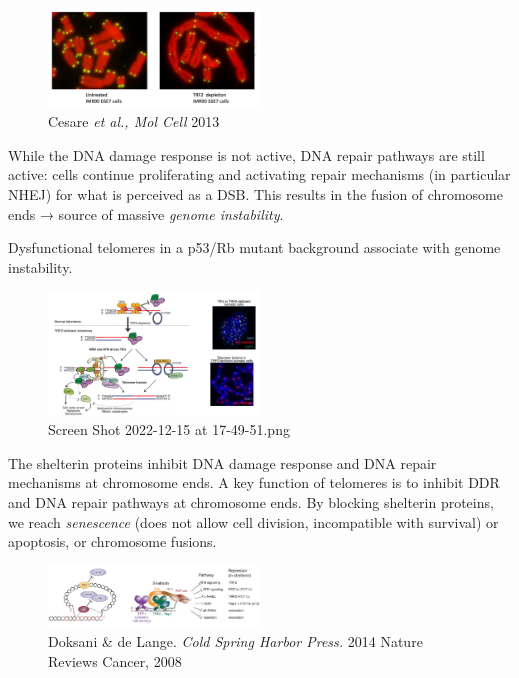 \begin{figure}
\centering
\includegraphics[width=0.5\textwidth]{../_resources/Screen_Shot_2022-12-15_at_17-54-31.png}
\caption{Cesare \emph{et al., Mol Cell} 2013}
\end{figure}

While the DNA damage response is not active, DNA repair pathways are
still active: cells continue proliferating and activating repair
mechanisms (in particular NHEJ) for what is perceived as a DSB. This
results in the fusion of chromosome ends → source of massive
\emph{genome instability}.

Dysfunctional telomeres in a p53/Rb mutant background associate with
genome instability.

\begin{figure}
\centering
\includegraphics[width=0.5\textwidth]{../_resources/Screen_Shot_2022-12-15_at_17-49-51.png}
\caption{Screen Shot 2022-12-15 at 17-49-51.png}
\end{figure}

The shelterin proteins inhibit DNA damage response and DNA repair
mechanisms at chromosome ends. A key function of telomeres is to inhibit
DDR and DNA repair pathways at chromosome ends. By blocking shelterin
proteins, we reach \emph{senescence} (does not allow cell division,
incompatible with survival) or apoptosis, or chromosome fusions.

\begin{figure}
\centering
\includegraphics[width=0.5\textwidth]{../_resources/Screen_Shot_2022-12-15_at_17-49-02.png}
\caption{Doksani \& de Lange. \emph{Cold Spring Harbor Press.} 2014
Nature Reviews Cancer, 2008}
\end{figure}

